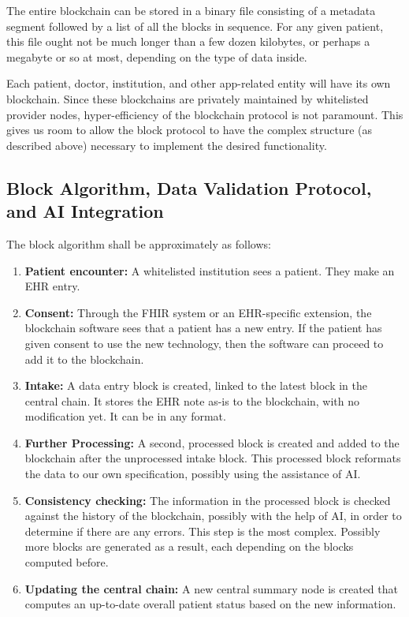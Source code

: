 \documentclass[12pt]{article}
\begin{document}
The entire blockchain can be stored in a binary file consisting of a metadata segment followed by a list of all the blocks in sequence. For any given patient, this file ought not be much longer than a few dozen kilobytes, or perhaps a megabyte or so at most, depending on the type of data inside.

Each patient, doctor, institution, and other app-related entity will have its own blockchain. Since these blockchains are privately maintained by whitelisted provider nodes, hyper-efficiency of the blockchain protocol is not paramount. This gives us room to allow the block protocol to have the complex structure (as described above) necessary to implement the desired functionality.

\subsection{Block Algorithm, Data Validation Protocol, and AI Integration}
The block algorithm shall be approximately as follows:
\begin{enumerate}
\item {\bf Patient encounter:} A whitelisted institution sees a patient. They make an EHR entry.
\item {\bf Consent:} Through the FHIR system or an EHR-specific extension, the blockchain software sees that a patient has a new entry. If the patient has given consent to use the new technology, then the software can proceed to add it to the blockchain.
\item {\bf Intake:} A data entry block is created, linked to the latest block in the central chain. It stores the EHR note as-is to the blockchain, with no modification yet. It can be in any format.
\item {\bf Further Processing:} A second, processed block is created and added to the blockchain after the unprocessed intake block. This processed block reformats the data to our own specification, possibly using the assistance of AI.
\item {\bf Consistency checking:} The information in the processed block is checked against the history of the blockchain, possibly with the help of AI, in order to determine if there are any errors. This step is the most complex. Possibly more blocks are generated as a result, each depending on the blocks computed before.
\item {\bf Updating the central chain:} A new central summary node is created that computes an up-to-date overall patient status based on the new information.
\end{enumerate}
\end{document}
